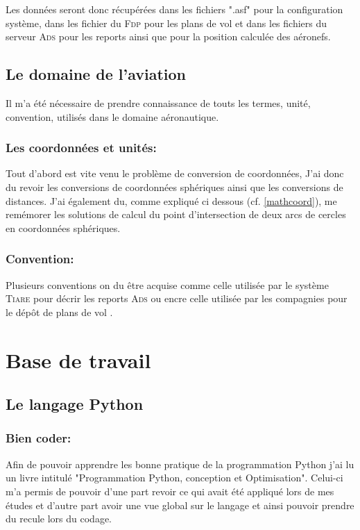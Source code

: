 Les données seront donc récupérées dans les fichiers ".asf" pour la configuration système, dans les fichier du \textsc{Fdp} pour les plans de vol et dans les fichiers du serveur \textsc{Ads} pour les reports ainsi que pour la position calculée des aéronefs.

    \subsection{Le domaine de l'aviation}
Il m'a été nécessaire de prendre connaissance de touts les termes, unité, convention, utilisés dans le domaine aéronautique.

        \subsubsection{Les coordonnées et unités:}
Tout d'abord est vite venu le problème de conversion de coordonnées, J'ai donc du revoir les conversions de coordonnées sphériques ainsi que les conversions de distances.
J'ai également du, comme expliqué ci dessous (cf. \vref{mathcoord}), me remémorer les solutions de calcul du point d'intersection de deux arcs de cercles en coordonnées sphériques.

        \subsubsection{Convention:}
Plusieurs conventions on du être acquise comme celle utilisée par le système \textsc{Tiare} pour décrir les reports \textsc{Ads} ou encre celle utilisée par les compagnies pour le dépôt de plans de vol .





\section{Base de travail}
    \subsection{Le langage Python}
        \subsubsection{Bien coder:\label{pygood}}
Afin de pouvoir apprendre les bonne pratique de la programmation Python j'ai lu un livre intitulé "Programmation Python, conception et Optimisation"\cite{pybook}. Celui-ci m'a permis de pouvoir d'une part revoir ce qui avait été appliqué lors de mes études et d'autre part avoir une vue global sur le langage et ainsi pouvoir prendre du recule lors du codage.

